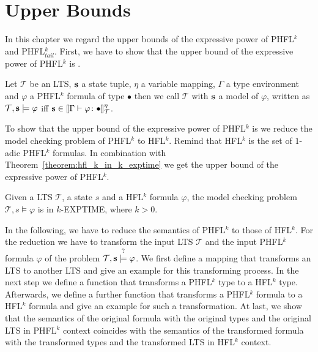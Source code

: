 
\chapter{Upper Bounds}\label{ch:upperBounds}

In this chapter we regard the upper bounds of the expressive power of PHFL$^k$ and PHFL$^k_{tail}$. First, we have to show that the upper
bound of the expressive power of PHFL$^k$ is .

\begin{definition}
    Let $\mathcal{T}$ be an LTS, $\emph{s}$ a state tuple, $\eta$ a variable mapping, $\Gamma$ a type environment and
    $\varphi$ a PHFL$^k$ formula of type $\bullet$ then we call $\mathcal{T}$ with $\emph{s}$ a model of $\varphi$,
    written as $\mathcal{T}, \emph{s} \models \varphi$ iff $\emph{s} \in \llbracket \Gamma
    \vdash \varphi \colon \bullet \rrbracket^\eta_\mathcal{T}$.
\end{definition}

To show that the upper bound of the expressive power of PHFL$^k$ is  we reduce the model checking
problem of PHFL$^k$ to HFL$^k$. Remind that HFL$^k$ is the set of $1$-adic PHFL$^k$
formulas. In combination with Theorem~\ref{theorem:hfl_k_in_k_exptime} we get the upper bound of the expressive power of PHFL$^k$.

\begin{theorem}{\cite{axelsson2007complexity}}
    \label{theorem:hfl_k_in_k_exptime}
    Given a LTS $\mathcal{T}$, a state $s$ and a HFL$^k$ formula $\varphi$, the model checking problem $\mathcal{T}, s
    \models \varphi$ is in $k$-EXPTIME, where $k > 0$.
\end{theorem}

In the following, we have to reduce the semantics of PHFL$^k$ to those of HFL$^k$.
For the reduction we have to transform the input LTS $\mathcal{T}$ and the input PHFL$^k$ formula $\varphi$ of the problem
$\mathcal{T}, \emph{s} \overset{?}{\models} \varphi$. We first define a mapping that transforms an LTS to another
LTS and give an example for this transforming process. In the next step we define a function that transforms a
PHFL$^k$ type to a HFL$^k$ type. Afterwards, we define a further function that transforms a PHFL$^k$ formula to a
HFL$^k$ formula and give an example for such a transformation. At last, we show that the semantics of the original
formula with the original types and the original LTS in PHFL$^k$ context coincides with the semantics of the
transformed formula with the transformed types and the transformed LTS in HFL$^k$ context.

